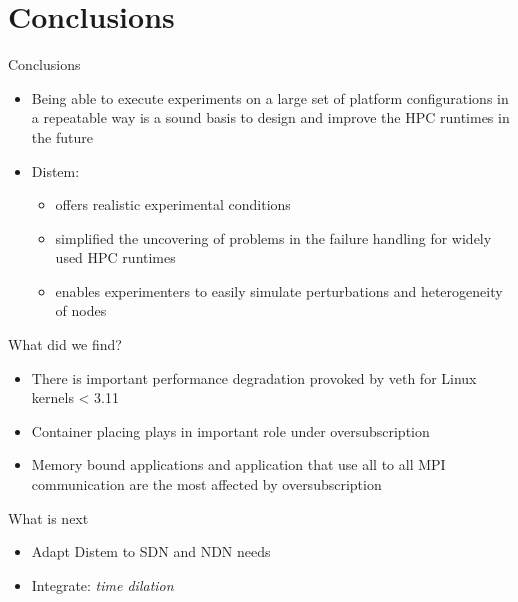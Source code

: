 \documentclass[11pt,xcolor=dvipsnames,presentation]{beamer}
\begin{document}
\section{Conclusions}
\label{sec-6}
\begin{frame}[label=sec-6-0-1]{Conclusions}
\begin{itemize}
\item Being able to execute experiments on a large set of platform
configurations in a repeatable way is a sound basis to design
and improve the HPC runtimes in the future
\end{itemize}

\vspace{0.5cm}
\begin{itemize}
\item \alert{Distem:}
\begin{itemize}
\item offers realistic experimental conditions

\item simplified the uncovering of problems in the
failure handling for widely used HPC runtimes

\item enables experimenters to easily simulate perturbations and
heterogeneity of nodes
\end{itemize}
\end{itemize}
\end{frame}
\begin{frame}[label=sec-6-0-2]{What did we find?}
\begin{itemize}
\item There is important performance degradation provoked by \alert{veth} for Linux kernels < 3.11
\item Container placing plays in important role under oversubscription
\item Memory bound applications and application that use \alert{all to all MPI} communication are
the most affected by oversubscription
\end{itemize}
\end{frame}

\begin{frame}[label=sec-6-0-3]{What is next}
\begin{itemize}
\item Adapt Distem to SDN and NDN needs
\item Integrate: \emph{time dilation}
\end{itemize}
\end{frame}
\end{document}
